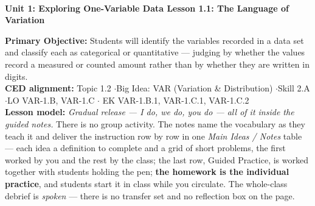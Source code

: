 \documentclass[10pt]{article}
\newcommand{\UnitNumberName}{Unit 1: Exploring One-Variable Data \quad}
\newcommand{\LessonNumberName}{Lesson 1.1: The Language of Variation}
\begin{document}
\begin{center}
    {\Large\bfseries \CourseName \\
    {\small\bfseries \UnitNumberName \LessonNumberName}}
\end{center}

\begin{tcolorbox}[colback=sky, colframe=navy, boxrule=0.9pt, arc=2mm,
    left=2mm, right=2mm, top=1.5mm, bottom=1.5mm]
    \textbf{Primary Objective:} Students will identify the variables recorded in a data set and
    classify each as categorical or quantitative --- judging by whether the values record a
    measured or counted amount rather than by whether they are written in digits.
    \\[2pt]
    \textbf{CED alignment:} Topic 1.2 \quad$\cdot$\quad Big Idea: VAR (Variation \& Distribution)
    \quad$\cdot$\quad Skill 2.A \quad$\cdot$\quad LO VAR-1.B, VAR-1.C \quad$\cdot$\quad
    EK VAR-1.B.1, VAR-1.C.1, VAR-1.C.2
    \\[2pt]
    \textbf{Lesson model:} \emph{Gradual release --- I do, we do, you do --- all of it inside
    the guided notes.} There is no group activity. The notes name the vocabulary as they teach
    it and deliver the instruction row by row in one \emph{Main Ideas / Notes} table --- each
    idea a definition to complete and a grid of short problems, the first worked by you and the
    rest by the class; the last row, Guided Practice, is worked together with students holding
    the pen; \textbf{the homework is the individual practice}, and students start it in class
    while you circulate. The whole-class debrief is \emph{spoken} --- there is no transfer set
    and no reflection box on the page.
\end{tcolorbox}
\end{document}
